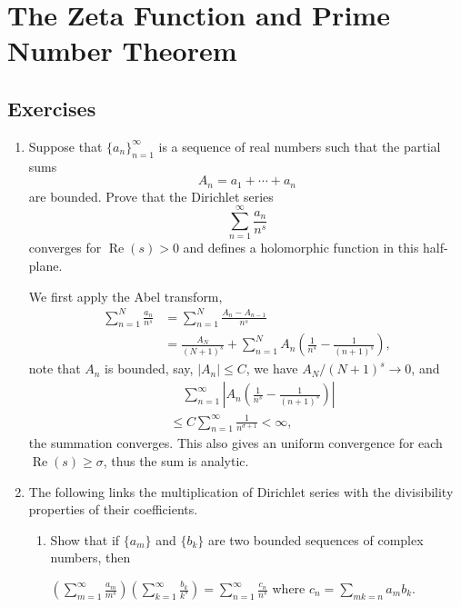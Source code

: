 \documentclass[11pt]{report}
\theoremstyle{mythm}
\let\oldendproof\endproof
\renewenvironment{proof}[1][\proofname]{%
  \oldproof[\normalfont \bfseries #1]%
}{\oldendproof}
\renewcommand*{\proofname}{Proof}
\theoremstyle{myans}
\renewcommand{\Re}{\operatorname{Re}}
\begin{document}
\setcounter{chapter}{6}
\chapter{The Zeta Function and Prime Number Theorem}

\section{Exercises}

\begin{enumerate}
  \item Suppose that $\{a_n\}_{n=1}^\infty$ is a sequence of real numbers such that the partial sums
  \[ A_n = a_1 + \cdots + a_n \]
  are bounded. Prove that the Dirichlet series
  \[ \sum_{n=1}^\infty \frac{a_n}{n^s} \]
  converges for $\Re(s) > 0$ and defines a holomorphic function in this half-plane.
  \begin{proof}
    We first apply the Abel transform,
    \begin{align*}
      \sum_{n=1}^N \frac{a_n}{n^s} &= \sum_{n=1}^N \frac{A_n - A_{n-1}}{n^s}\\
      &= \frac{A_N}{(N+1)^s} + \sum_{n=1}^N A_n \left(\frac 1{n^s} - \frac 1{(n+1)^s}\right),
    \end{align*}
    note that $A_n$ is bounded, say, $|A_n|\leq C$, we have $A_N/(N+1)^s \to 0$,
    and
    \begin{align*}
      &\quad \sum_{n=1}^\infty \left| A_n \left( \frac 1{n^s} - \frac 1{(n+1)^s}\right) \right|\\
      &\leq C\sum_{n=1}^\infty \frac 1{n^{\sigma + 1}} < \infty,
    \end{align*}
    the summation converges. This also gives an uniform convergence for each $\Re(s) \geq \sigma$,
    thus the sum is analytic.
  \end{proof}
  \item The following links the multiplication of Dirichlet series with the divisibility
  properties of their coefficients.
  \begin{enumerate}
    \item Show that if $\{a_m\}$ and $\{b_k\}$ are two bounded sequences of complex numbers, then
    \begin{center}
      $\displaystyle \left(\sum_{m=1}^\infty \frac{a_m}{m^s}\right)
      \left(\sum_{k=1}^\infty \frac{b_k}{k^s}\right) = \sum_{n=1}^\infty \frac{c_n}{n^s}$
      \quad where $c_n = \sum_{mk=n}a_m b_k$.
    \end{center}

\end{enumerate}
\end{enumerate}
\end{document}
